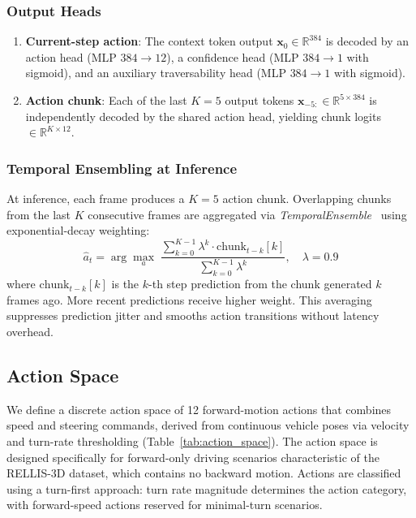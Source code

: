 \documentclass[journal]{IEEEtran}
\begin{document}
\subsubsection{Output Heads}
\begin{enumerate}
    \item \textbf{Current-step action}: The context token output $\mathbf{x}_0 \in \mathbb{R}^{384}$ is decoded by an action head (MLP $384{\to}12$), a confidence head (MLP $384{\to}1$ with sigmoid), and an auxiliary traversability head (MLP $384{\to}1$ with sigmoid).
    \item \textbf{Action chunk}: Each of the last $K{=}5$ output tokens $\mathbf{x}_{-5:} \in \mathbb{R}^{5 \times 384}$ is independently decoded by the shared action head, yielding chunk logits $\in \mathbb{R}^{K \times 12}$.
\end{enumerate}

\subsubsection{Temporal Ensembling at Inference}
At inference, each frame produces a $K{=}5$ action chunk. Overlapping chunks from the last $K$ consecutive frames are aggregated via \emph{TemporalEnsemble}~\cite{zhao2023act} using exponential-decay weighting:
\begin{equation}
    \hat{a}_t = \arg\max_a \;\frac{\displaystyle\sum_{k=0}^{K-1} \lambda^k \cdot \text{chunk}_{t-k}[k]}
                                  {\displaystyle\sum_{k=0}^{K-1} \lambda^k},
    \quad \lambda = 0.9
\end{equation}
where $\text{chunk}_{t-k}[k]$ is the $k$-th step prediction from the chunk generated $k$ frames ago. More recent predictions receive higher weight. This averaging suppresses prediction jitter and smooths action transitions without latency overhead.

\subsection{Action Space}
\label{sec:action_space}

We define a discrete action space of 12 forward-motion actions that combines speed and steering commands, derived from continuous vehicle poses via velocity and turn-rate thresholding (Table~\ref{tab:action_space}). The action space is designed specifically for forward-only driving scenarios characteristic of the RELLIS-3D dataset, which contains no backward motion. Actions are classified using a turn-first approach: turn rate magnitude determines the action category, with forward-speed actions reserved for minimal-turn scenarios.
\end{document}
